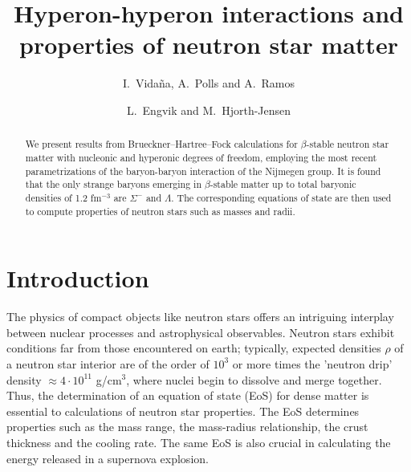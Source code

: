 
\draft



\title{Hyperon-hyperon interactions and properties of 
       neutron star matter}

\author{I.\ Vida\~na, A.\ Polls and A.\ Ramos}

\address{Departament d'Estructura i Constituents de la Mat\`eria,
         Universitat de Barcelona, E-08028 Barcelona, Spain}

\author{L.\ Engvik and M.\  Hjorth-Jensen}

\address{Department of Physics, University of Oslo, N-0316 Oslo, Norway}

\maketitle

\begin{abstract}

We present results from Brueckner--Hartree--Fock calculations
for $\beta$-stable neutron star
matter with nucleonic and
hyperonic degrees of freedom, employing the most recent parametrizations
of the baryon-baryon interaction of the Nijmegen group.
It is found that the only strange baryons emerging in $\beta$-stable matter
up to total baryonic densities of 1.2 fm$^{-3}$ are $\Sigma^-$ and
$\Lambda$.
The corresponding equations of state are then used to compute properties 
of neutron stars such as masses and radii.


\end{abstract}




\section{Introduction}

The physics of compact objects like neutron stars offers
an intriguing interplay between nuclear processes  and
astrophysical observables.
Neutron stars exhibit conditions far from those
encountered on earth; typically, expected densities $\rho$
of a neutron star interior are of the
order of $10^3$ or more times the 'neutron drip' density 
$\approx 4\cdot 10^{11}$ g/cm$^{3}$,
where  nuclei begin to
dissolve and merge together.
Thus, the determination of an equation of state (EoS)
for dense matter is essential to calculations of neutron
star properties. The EoS determines properties  such as
the mass range, the mass-radius relationship, the crust
thickness and the cooling rate.
The same EoS is also crucial
in calculating the energy released in a supernova explosion.

